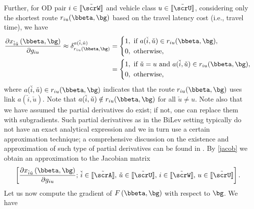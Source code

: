 \documentclass[3p]{elsarticle}
\begin{document}
Further, for OD pair $i \in [\kern-0.15em[ \tilde \scrW 
	]\kern-0.15em]$ and vehicle class $u \in [\kern-0.15em[ \tilde \scrU 
	]\kern-0.15em]$, considering only the shortest route $r_{iu}(\bbeta,\bg)$ based on the travel latency cost (i.e., travel time), we have 
\begin{align}
	\frac{{\partial {x_{\check i \check u}}\left(\bbeta, \bg  \right)}}{{\partial {g _{iu}}}} \approx {\delta _{{r_{iu}(\bbeta,\bg)}}^{a(\check{i},\check{u})}} &= \left\{ \begin{gathered}
	1,{\text{ if }}a(\check{i},\check{u}) \in {r_{iu}(\bbeta,\bg)}, \hfill \\
	0,{\text{ otherwise}}{\text{,}} \hfill \\  
	\end{gathered}  \right.  \notag \\ 
	&= \left\{ \begin{gathered}
	1,{\text{ if }} \check{u} = u \text{ and } a(\check{i},\check{u}) \in {r_{iu}(\bbeta,\bg)}, \hfill \\
	0,{\text{ otherwise}}{\text{,}} \hfill \\  
	\end{gathered}  \right.  \label{jacob}
\end{align}
where $a(\check{i},\check{u}) \in {r_{iu}(\bbeta,\bg)}$ indicates that
the route $r_{iu}(\bbeta,\bg)$ uses link $a(\check{i},\check{u})$. Note
that $a(\check{i},\check{u}) \notin {r_{iu}(\bbeta,\bg)}$ for all $
\check u \neq u$. Note also that we have assumed the partial derivatives
do exist; if not, one can replace them with subgradients. Such partial
derivatives as in the BiLev setting typically do not have an exact
analytical expression and we in turn use a certain approximation
technique; a comprehensive discussion on the existence and approximation
of such type of partial derivatives can be found in
\cite{patriksson2004sensitivity}. By \eqref{jacob} we obtain an
approximation to the Jacobian matrix
\begin{align}
	\left[ {\frac{{\partial {x_{\check{i}\check{u}}}\left(\bbeta, {{\bg}} \right)}}{{\partial {g _{iu}}}};\, \check{i} \in [\kern-0.15em[ \tilde \scrA 
		]\kern-0.15em],\,\check{u} \in [\kern-0.15em[ \tilde \scrU 
		]\kern-0.15em],\,i \in [\kern-0.15em[ \tilde \scrW 
		]\kern-0.15em], \, u \in [\kern-0.15em[ \tilde \scrU 
		]\kern-0.15em]} \right]. \label{jacobMat}
\end{align}
Let us now compute the gradient of $F\left(\bbeta, \bg \right)$ with
respect to $\bg$. We have
\end{document}
